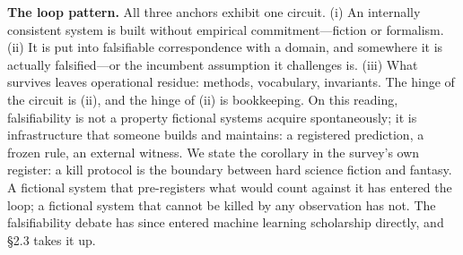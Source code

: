 \documentclass[11pt]{article}
\begin{document}
\noindent \textbf{The loop pattern.} All three anchors exhibit one circuit. (i) An internally consistent system is built without empirical commitment—fiction or formalism. (ii) It is put into falsifiable correspondence with a domain, and somewhere it is actually falsified—or the incumbent assumption it challenges is. (iii) What survives leaves operational residue: methods, vocabulary, invariants. The hinge of the circuit is (ii), and the hinge of (ii) is bookkeeping. On this reading, falsifiability is not a property fictional systems acquire spontaneously; it is infrastructure that someone builds and maintains: a registered prediction, a frozen rule, an external witness. We state the corollary in the survey's own register: a kill protocol is the boundary between hard science fiction and fantasy. A fictional system that pre-registers what would count against it has entered the loop; a fictional system that cannot be killed by any observation has not. The falsifiability debate has since entered machine learning scholarship directly, and §2.3 takes it up.\par
\end{document}
